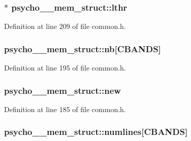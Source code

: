 \subsubsection[{\texorpdfstring{lthr}{lthr}}]{$\ast$ psycho\+\_\+\_\+mem\+\_\+struct\+::lthr}\hypertarget{structpsycho__4__mem__struct_a54e6e8825d804d8d1ee5fe57c4d50987}{}\label{structpsycho__4__mem__struct_a54e6e8825d804d8d1ee5fe57c4d50987}


Definition at line 209 of file common.\+h.

\subsubsection[{\texorpdfstring{nb}{nb}}]{ psycho\+\_\+\_\+mem\+\_\+struct\+::nb\mbox{[}{\bf C\+B\+A\+N\+DS}\mbox{]}}\hypertarget{structpsycho__4__mem__struct_adf524129f653a0c73be0fb13cb6ca861}{}\label{structpsycho__4__mem__struct_adf524129f653a0c73be0fb13cb6ca861}


Definition at line 195 of file common.\+h.

\subsubsection[{\texorpdfstring{new}{new}}]{ psycho\+\_\+\_\+mem\+\_\+struct\+::new}\hypertarget{structpsycho__4__mem__struct_a2426debb5736e2849a2e10410a5b2836}{}\label{structpsycho__4__mem__struct_a2426debb5736e2849a2e10410a5b2836}


Definition at line 185 of file common.\+h.

\subsubsection[{\texorpdfstring{numlines}{numlines}}]{ psycho\+\_\+\_\+mem\+\_\+struct\+::numlines\mbox{[}{\bf C\+B\+A\+N\+DS}\mbox{]}}\hypertarget{structpsycho__4__mem__struct_a17495ef0e7a3533e5c03f03ff6d39ff6}{}\label{structpsycho__4__mem__struct_a17495ef0e7a3533e5c03f03ff6d39ff6}


